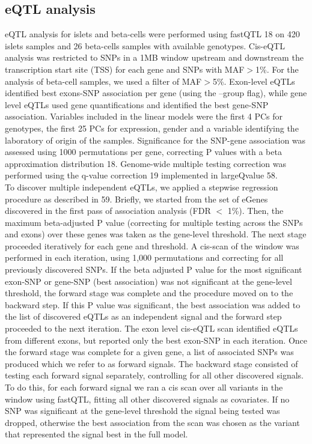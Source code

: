 \subsection{eQTL analysis}
eQTL analysis for islets and beta-cells were performed using fastQTL 18 on 420 islets samples and 26 beta-cells samples with available genotypes. Cis-eQTL analysis was restricted to SNPs in a 1MB window upstream and downstream the transcription start site (TSS) for each gene and SNPs with MAF$>$1\%. For the analysis of beta-cell samples, we used a filter of MAF$>$5\%. Exon-level eQTLs identified best exons-SNP association per gene (using the –group flag), while gene level eQTLs used gene quantifications and identified the best gene-SNP association. Variables included in the linear models were the first 4 PCs for genotypes, the first 25 PCs for expression, gender and a variable identifying the laboratory of origin of the samples. Significance for the SNP-gene association was assessed using 1000 permutations per gene, correcting P values with a beta approximation distribution 18. Genome-wide multiple testing correction was performed using the q-value correction 19 implemented in largeQvalue 58. \\
    
To discover multiple independent eQTLs, we applied a stepwise regression procedure as described in 59. Briefly, we started from the set of eGenes discovered in the first pass of association analysis (FDR $<$ 1\%). Then, the maximum beta-adjusted P value (correcting for multiple testing across the SNPs and exons) over these genes was taken as the gene-level threshold. The next stage proceeded iteratively for each gene and threshold. A cis-scan of the window was performed in each iteration, using 1,000 permutations and correcting for all previously discovered SNPs. If the beta adjusted P value for the most significant exon-SNP or gene-SNP (best association) was not significant at the gene-level threshold, the forward stage was complete and the procedure moved on to the backward step. If this P value was significant, the best association was added to the list of discovered eQTLs as an independent signal and the forward step proceeded to the next iteration. The exon level cis-eQTL scan identified eQTLs from different exons, but reported only the best exon-SNP in each iteration. Once the forward stage was complete for a given gene, a list of associated SNPs was produced which we refer to as forward signals. The backward stage consisted of testing each forward signal separately, controlling for all other discovered signals. To do this, for each forward signal we ran a cis scan over all variants in the window using fastQTL, fitting all other discovered signals as covariates. If no SNP was significant at the gene-level threshold the signal being tested was dropped, otherwise the best association from the scan was chosen as the variant that represented the signal best in the full model.

